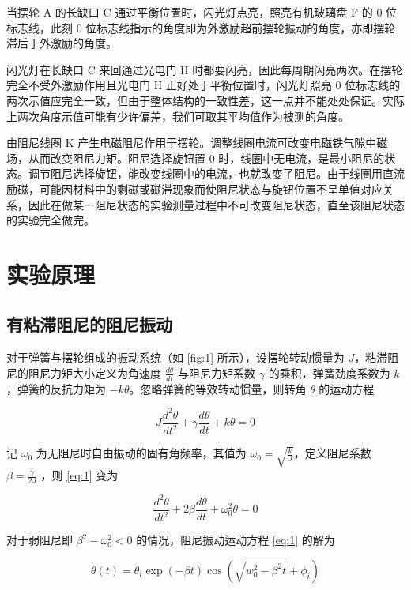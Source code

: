 \documentclass[12pt,a4paper]{amsart}
\begin{document}
当摆轮 A 的长缺口 C 通过平衡位置时，闪光灯点亮，照亮有机玻璃盘 F 的 0 位标志线，此刻 0 位标志线指示的角度即为外激励超前摆轮振动的角度，亦即摆轮滞后于外激励的角度。

闪光灯在长缺口 C 来回通过光电门 H 时都要闪亮，因此每周期闪亮两次。在摆轮完全不受外激励作用且光电门 H 正好处于平衡位置时，闪光灯照亮 0 位标志线的两次示值应完全一致，但由于整体结构的一致性差，这一点并不能处处保证。实际上两次角度示值可能有少许偏差，我们可取其平均值作为被测的角度。

由阻尼线圈 K 产生电磁阻尼作用于摆轮。调整线圈电流可改变电磁铁气隙中磁场，从而改变阻尼力矩。阻尼选择旋钮置 0 时，线圈中无电流，是最小阻尼的状态。调节阻尼选择旋钮，能改变线圈中的电流，也就改变了阻尼。由于线圈用直流励磁，可能因材料中的剩磁或磁滞现象而使阻尼状态与旋钮位置不呈单值对应关系，因此在做某一阻尼状态的实验测量过程中不可改变阻尼状态，直至该阻尼状态的实验完全做完。

\section{实验原理}

\subsection{有粘滞阻尼的阻尼振动}

对于弹簧与摆轮组成的振动系统（如 \ref{fig:1} 所示），设摆轮转动惯量为 $J$，粘滞阻尼的阻尼力矩大小定义为角速度 $\frac{d\theta}{dt}$ 与阻尼力矩系数 $\gamma$ 的乘积，弹簧劲度系数为 $k$，弹簧的反抗力矩为 $-k\theta$。忽略弹簧的等效转动惯量，则转角 $\theta$ 的运动方程

\begin{equation}
    J\frac{d^2\theta}{dt^2} + \gamma\frac{d\theta}{dt} + k\theta = 0 \label{eq:1}
\end{equation}

记 $\omega_0$ 为无阻尼时自由振动的固有角频率，其值为 $\omega_0 = \sqrt{\frac{k}{J}}$，定义阻尼系数 $\beta = \frac{\gamma}{2J}$ ，则 \ref{eq:1} 变为

\begin{equation}
    \frac{d^2\theta}{dt^2} + 2\beta\frac{d\theta}{dt} + \omega_0^2\theta = 0 \label{eq:2}
\end{equation}

对于弱阻尼即 $\beta^2-\omega_0^2<0$ 的情况，阻尼振动运动方程 \ref{eq:1} 的解为

\begin{equation}
    \theta(t) = \theta_i \exp(-\beta t)\cos(\sqrt{w_0^2-\beta^2 t} + \phi_i) \label{eq:3}
\end{equation}
\end{document}

